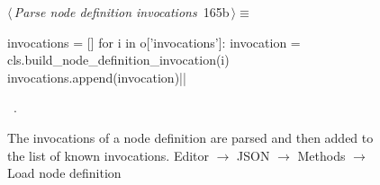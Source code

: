 \documentclass[%
    a4paper,    %
    justified,  %
    nobib,      %
    openany     %
]{tufte-book}
\makeatletter
\renewcommand{\label}[1]{\@tufte@label{##1}}%
\makeatother
\begin{document}
\begin{figure}[!htbp]
\begin{flushleft} \small
\begin{minipage}{\linewidth}\label{scrap131}\raggedright\small
{} $\langle\,${\itshape Parse node definition invocations}\nobreak\ {\footnotesize {165b}}$\,\rangle\equiv$
\vspace{-1ex}
\begin{pythoncode}
invocations = []
for i in o['invocations']:
    invocation = cls.build_node_definition_invocation(i)
    invocations.append(invocation)|\NWsep|
\end{pythoncode}
\vspace{1.5ex}
\footnotesize
\begin{list}{}{\setlength{\itemsep}{-\parsep}\setlength{\itemindent}{-\leftmargin}}
\item \NWtxtMacroRefIn\ .

\item{}
\end{list}
\end{minipage}\vspace{4ex}
\end{flushleft}
\caption{The invocations of a node definition are parsed and then added to
the list of known invocations.
  \newline{}\newline{}Editor $\rightarrow$ JSON $\rightarrow$
  Methods $\rightarrow$ Load node definition}
\end{figure}
\end{document}
